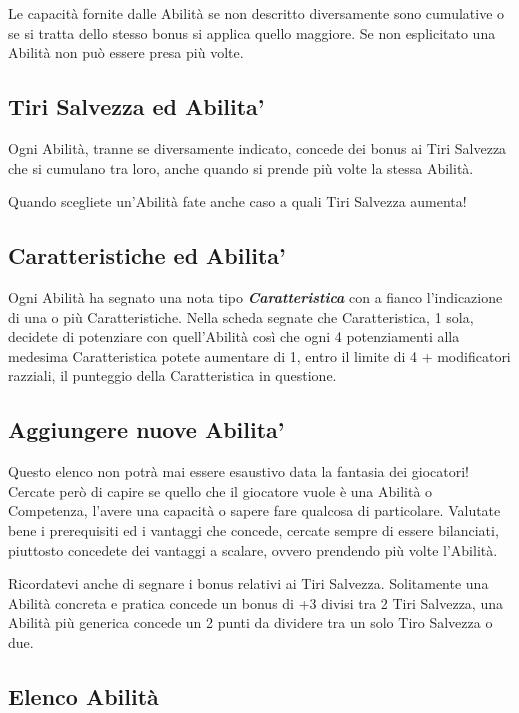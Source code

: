 \begin{multicols}{2}
Le capacità fornite dalle Abilità se non descritto diversamente sono cumulative o se si tratta dello stesso bonus si applica quello maggiore. Se non esplicitato una Abilità non può essere presa più volte.

\subsection{Tiri Salvezza ed Abilita'}\label{tirisalvezzaedabilita}

Ogni Abilità, tranne se diversamente indicato, concede dei bonus ai Tiri Salvezza che si cumulano tra loro, anche quando si prende più volte la stessa Abilità.

Quando scegliete un'Abilità fate anche caso a quali Tiri Salvezza aumenta!

\subsection{Caratteristiche ed Abilita'}\label{caratteristicheedabilita}

Ogni Abilità ha segnato una nota tipo \emph{\textbf{Caratteristica}} con a fianco l'indicazione di una o più Caratteristiche. Nella scheda segnate che Caratteristica, 1 sola, decidete di potenziare con quell'Abilità così che ogni 4 potenziamenti alla medesima Caratteristica potete aumentare di 1, entro il limite di 4 + modificatori razziali, il punteggio della Caratteristica in questione.

\subsection{Aggiungere nuove Abilita'}\label{aggiungereabilita}

Questo elenco non potrà mai essere esaustivo data la fantasia dei giocatori! Cercate però di capire se quello che il giocatore vuole è una Abilità o Competenza, l'avere una capacità o sapere fare qualcosa di particolare.
Valutate bene i prerequisiti ed i vantaggi che concede, cercate sempre di essere bilanciati, piuttosto concedete dei vantaggi a scalare, ovvero prendendo più volte l'Abilità.

Ricordatevi anche di segnare i bonus relativi ai Tiri Salvezza. Solitamente una Abilità concreta e pratica concede un bonus di +3 divisi tra 2 Tiri Salvezza, una Abilità più generica concede un 2 punti da dividere tra un solo Tiro Salvezza o due.

\subsection{Elenco Abilità}


\end{multicols}
